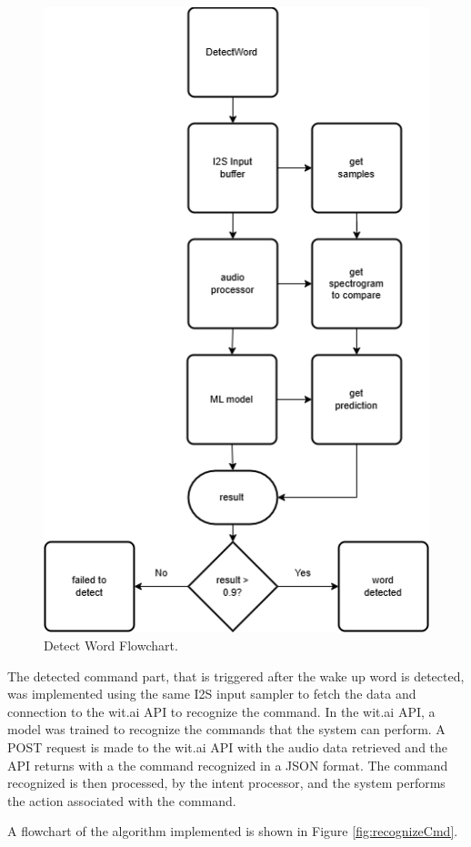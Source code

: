 \begin{figure}[H]
    \centering
    \includegraphics*[scale = 0.6]{Images/detectWord.png}
    \caption{Detect Word Flowchart.}
    \label{fig:detectWord}
\end{figure}

The detected command part, that is triggered after the wake up word is detected, was implemented using the same I2S input sampler to fetch the data and connection to the wit.ai API to recognize the command. In the wit.ai API, a model was trained to recognize the commands that the system can perform. A POST request is made to the wit.ai API with the audio data retrieved and the API returns with a the command recognized in a JSON format. The command recognized is then processed, by the intent processor, and the system performs the action associated with the command. 

A flowchart of the algorithm implemented is shown in Figure \ref{fig:recognizeCmd}. 

